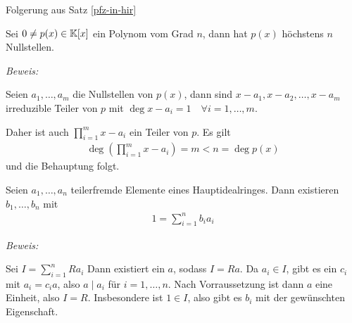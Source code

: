 
\begin{mylemma} Folgerung aus Satz \ref{pfz-in-hir}

    Sei $0 \neq p(x) \in \mathbb{K}[x]$ ein Polynom vom Grad $n$, dann hat $p(x)$ höchstens $n$ Nullstellen.

    \textit{Beweis:}

    Seien $a_1, \ldots, a_m$ die Nullstellen von $p(x)$, dann sind $x - a_1, x - a_2, \ldots, x - a_m$ irreduzible Teiler von $p$ mit $\deg x - a_i = 1 \quad \forall i = 1, \ldots, m$.
    
    Daher ist auch $\prod\limits_{i = 1}^m x - a_i$ ein Teiler von $p$.
    Es gilt
    \begin{align*}
        \deg \left( \prod_{i = 1}^m x - a_i \right) = m < n = \deg p(x)
    \end{align*}
    und die Behauptung folgt.
\end{mylemma}


\begin{mylemma}\label{lem2.13} \qquad  \par
    Seien $a_1,\ldots,a_n$ teilerfremde Elemente eines Hauptidealringes. Dann existieren $b_1,\ldots,b_n$ mit 
    \begin{align*}
        1 = \sum_{i=1}^n b_ia_i
    \end{align*}

    \textit{Beweis:}

    Sei $I = \sum\limits_{i=1}^n Ra_i$ Dann existiert ein $a$, sodass $I = Ra$. Da $a_i \in I$, gibt es ein $c_i$ mit $a_i = c_i a$, also $a \mid a_i$ für $i=1,\ldots,n$.
    Nach Vorraussetzung ist dann $a$ eine Einheit, also $I=R$. Insbesondere ist $1 \in I$, also gibt es $b_i$ mit der gewünschten Eigenschaft.
\end{mylemma}


